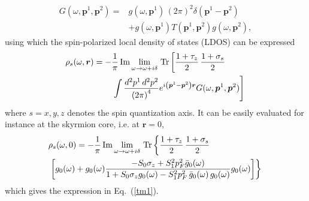 \documentclass[twocolumn,showpacs,floatfix,longbibliography]{revtex4-1}
\begin{document}
\begin{align}
	G(\omega,\bm p^1,\bm p^2) =& g(\omega,\bm p^1)\,(2\pi)^2\delta(\bm p^1-\bm p^2) \nonumber \\
	          &  +g(\omega,\bm p^1) T(\bm p^1,\bm p^2) g(\omega,\bm p^2),
	\label{G}
\end{align}
using which the spin-polarized local density of states (LDOS) can be expressed
\begin{align}
	\rho_s(\omega,\bm r) = -&\frac{1}{\pi}\,{\rm Im}\lim_{\omega\rightarrow \omega+i\delta}{\rm\,Tr} \left[ \frac{1+\tau_z}{2}\,\frac{1+\sigma_s}{2} \right. \label{rhor} \\
	&\left.\int \frac{d^2p^1\,d^2p^2}{\left( 2\pi \right)^4} e^{i\left( \bm p^1-\bm p^2 \right)\bm r} G(\omega,\bm p^1,\bm p^2)\right]\, \nonumber
\end{align}
where $s=x,y,z$ denotes the spin quantization axis. It can be easily evaluated for instance at the skyrmion core, i.e. at $\bm r=0$,
\begin{align}
	& \rho_s(\omega,0) = -\frac{1}{\pi}\,{\rm Im}\lim_{\omega\rightarrow \omega+i\delta}{\rm \,Tr} \left\{  \frac{1+\tau_z}{2}\,\frac{1+\sigma_s}{2}  \right. \label{spldos} \\
	&\left.\left[g_0(\omega)+g_0(\omega)  \frac{-S_0\sigma_z+S^2_1p_F^2\bar g_{0}(\omega)}{1+S_0\sigma_zg_{0}(\omega)-S^2_1p_F^2\,\bar g_{0}(\omega)\, g_{0}(\omega)} g_0(\omega)  \right]\right\}\, \nonumber
\end{align}
which gives the expression in Eq.~(\ref{tm1}).
\end{document}
